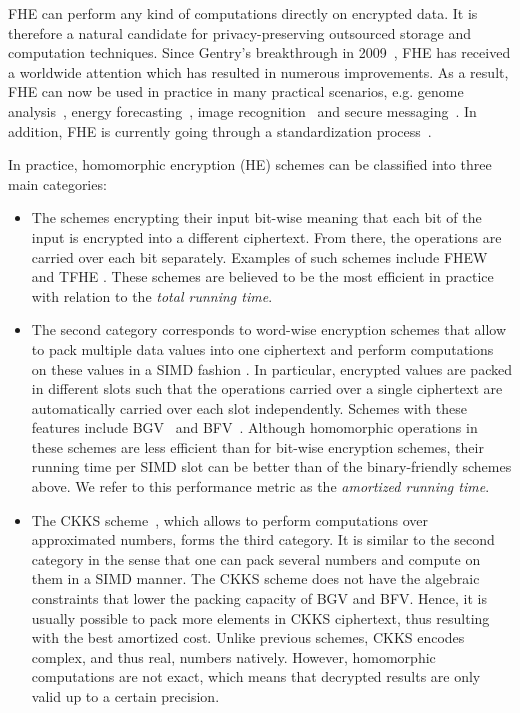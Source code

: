 \ac{FHE} can perform any kind of computations directly on encrypted data. 
It is therefore a natural candidate for privacy-preserving outsourced storage and computation techniques. 
Since Gentry's breakthrough in 2009~\cite{STOC:Gentry09}, FHE has received a worldwide attention which has resulted in numerous improvements. 
As a result, \ac{FHE} can now be used in practice in many practical scenarios, e.g. genome analysis~\cite{KL15}, energy forecasting~\cite{BCIV17}, image recognition~\cite{BMMP18} and secure messaging~\cite{SP:ACLS18}. 
In addition, FHE is currently going through a standardization process~\cite{HomomorphicEncryptionSecurityStandard}.
  
In practice, homomorphic encryption (HE) schemes can be classified into three main categories:
\begin{itemize}
	\item The schemes encrypting their input bit-wise meaning that each bit of the input is encrypted into a different ciphertext. 
	From there, the operations are carried over each bit separately. 
	Examples of such schemes include FHEW \cite{DM15} and TFHE \cite{CGGI16}. 
	These schemes are believed to be the most efficient in practice with relation to the \emph{total running time}.
	\item The second category corresponds to word-wise encryption schemes that allow to pack multiple data values into one ciphertext and perform computations on these values in a \ac{SIMD} fashion \cite{SV14}. 
	In particular, encrypted values are packed in different slots such that the operations carried over a single ciphertext are automatically carried over each slot independently. 
	Schemes with these features include BGV~\cite{BGV12} and BFV~\cite{C:Brakerski12,FV12}. 
	Although homomorphic operations in these schemes are less efficient than for bit-wise encryption schemes, their running time per SIMD slot can be better than of the binary-friendly schemes above. 
	We refer to this performance metric as the \emph{amortized running time}.
	\item The CKKS scheme~\cite{CKKS17}, which allows to perform computations over approximated numbers, forms the third category. 
	It is similar to the second category in the sense that one can pack several numbers and compute on them in a SIMD manner.
	The CKKS scheme does not have the algebraic constraints that lower the packing capacity of BGV and BFV. 
	Hence, it is usually possible to pack more elements in CKKS ciphertext, thus resulting with the best amortized cost. 
	Unlike previous schemes, CKKS encodes complex, and thus real, numbers natively. 
	However, homomorphic computations are not exact, which means that decrypted results are only valid up to a certain precision. 
\end{itemize}


